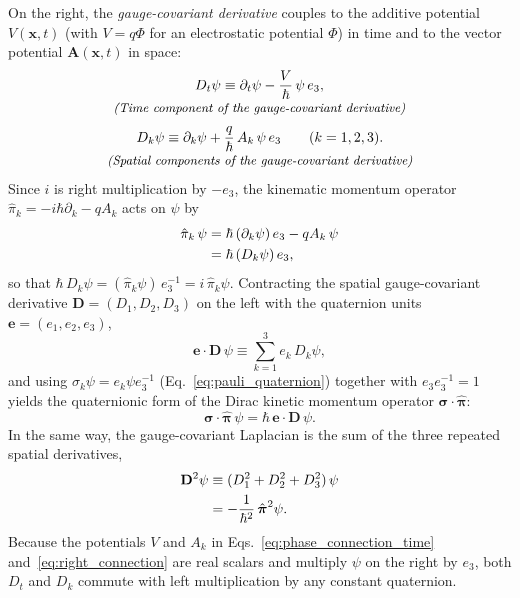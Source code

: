 \documentclass[aps,prd,onecolumn,tightenlines,nofootinbib,notitlepage,11pt,floatfix]{revtex4-2}
\theoremstyle{indentedtheorem}
\begin{document}
On the right, the \emph{gauge-covariant derivative} couples to the additive potential $V(\mathbf{x},t)$ (with $V=q\Phi$ for an electrostatic potential $\Phi$) in time and to the vector potential $\mathbf{A}(\mathbf{x},t)$ in space:
\begin{equation}
    \begin{gathered}
    D_t\psi \equiv \partial_t\psi - \frac{V}{\hbar}\,\psi\,e_3 , \\[-3pt]
    \text{\small\itshape (Time component of the gauge-covariant derivative)}
    \end{gathered}
    \label{eq:phase_connection_time}
\end{equation}
\begin{equation}
    \begin{gathered}
    D_k\psi \equiv \partial_k\psi + \frac{q}{\hbar}\,A_k\,\psi\,e_3 \qquad (k=1,2,3) . \\[-3pt]
    \text{\small\itshape (Spatial components of the gauge-covariant derivative)}
    \end{gathered}
    \label{eq:right_connection}
\end{equation}
Since $i$ is right multiplication by $-e_3$, the kinematic momentum operator $\hat{\pi}_k = -i\hbar\partial_k - qA_k$ acts on $\psi$ by
\begin{align}
    \hat{\pi}_k\,\psi &= \hbar\,(\partial_k\psi)\,e_3 - qA_k\,\psi \notag\\
    &= \hbar\,(D_k\psi)\,e_3 ,
    \label{eq:pi_hat_quaternion}
\end{align}
so that $\hbar\,D_k\psi = (\hat{\pi}_k\psi)\,e_3^{-1} = i\,\hat{\pi}_k\psi$. Contracting the spatial gauge-covariant derivative $\mathbf{D}=(D_1,D_2,D_3)$ on the left with the quaternion units $\mathbf{e}=(e_1,e_2,e_3)$,
\begin{equation}
    \mathbf{e}\cdot\mathbf{D}\,\psi \equiv \sum_{k=1}^{3} e_k\,D_k\psi ,
    \label{eq:e_dot_D}
\end{equation}
and using $\sigma_k\psi = e_k\psi e_3^{-1}$ (Eq.~\eqref{eq:pauli_quaternion}) together with $e_3 e_3^{-1}=1$ yields the quaternionic form of the Dirac kinetic momentum operator $\boldsymbol{\sigma}\cdot\hat{\boldsymbol{\pi}}$:
\begin{equation}
    \boldsymbol{\sigma}\cdot\hat{\boldsymbol{\pi}}\,\psi = \hbar\,\mathbf{e}\cdot\mathbf{D}\,\psi .
    \label{eq:momentum_operator}
\end{equation}
In the same way, the gauge-covariant Laplacian is the sum of the three repeated spatial derivatives,
\begin{align}
    \mathbf{D}^2\psi &\equiv (D_1^2 + D_2^2 + D_3^2)\,\psi \notag\\
    &= -\frac{1}{\hbar^2}\,\hat{\boldsymbol{\pi}}^2\psi .
    \label{eq:D_squared}
\end{align}
Because the potentials $V$ and $A_k$ in Eqs.~\eqref{eq:phase_connection_time} and~\eqref{eq:right_connection} are real scalars and multiply $\psi$ on the right by $e_3$, both $D_t$ and $D_k$ commute with left multiplication by any constant quaternion.
\end{document}
